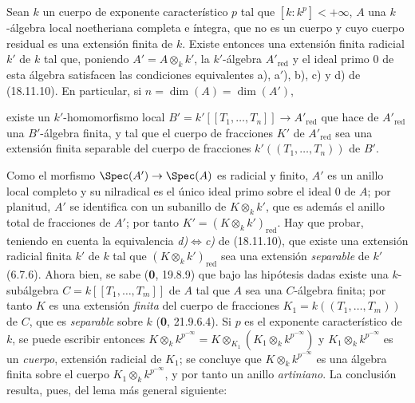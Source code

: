 \begin{corollary}[18.11.12]
\label{IV.18.11.12}
Sean $k$ un cuerpo de exponente característico $p$ tal que $[k:k^p]<+\infty$, $A$ una $k$-álgebra local noetheriana completa e íntegra, que no es un cuerpo y cuyo cuerpo residual es una extensión finita de $k$. Existe entonces una extensión finita radicial $k'$ de $k$ tal que, poniendo $A'=A\otimes_k k'$, la $k'$-álgebra $A'_{\mathrm{red}}$ y el ideal primo $0$ de esta álgebra satisfacen las condiciones equivalentes \textup{a), a$'$), b), c)} y \textup{d)} de \textup{(18.11.10)}. En particular, si $n=\dim(A)=\dim(A')$,


existe un $k'$-homomorfismo local $B'=k'[[T_1,\ldots,T_n]]\to A'_{\mathrm{red}}$ que hace de $A'_{\mathrm{red}}$ una $B'$-álgebra finita, y tal que el cuerpo de fracciones $K'$ de $A'_{\mathrm{red}}$ sea una extensión finita \textup{separable} del cuerpo de fracciones $k'((T_1,\ldots,T_n))$ de $B'$.
\end{corollary}

Como el morfismo $\Spec(A')\to\Spec(A)$ es radicial y finito, $A'$ es un anillo local completo y su nilradical es el único ideal primo sobre el ideal $0$ de $A$; por planitud, $A'$ se identifica con un subanillo de $K\otimes_k k'$, que es además el anillo total de fracciones de $A'$; por tanto $K'=(K\otimes_k k')_{\mathrm{red}}$. Hay que probar, teniendo en cuenta la equivalencia \emph{d)}$\Leftrightarrow$\emph{c)} de (18.11.10), que existe una extensión radicial finita $k'$ de $k$ tal que $(K\otimes_k k')_{\mathrm{red}}$ sea una extensión \emph{separable} de $k'$ (6.7.6). Ahora bien, se sabe (\textbf 0, 19.8.9) que bajo las hipótesis dadas existe una $k$-subálgebra $C=k[[T_1,\ldots,T_m]]$ de $A$ tal que $A$ sea una $C$-álgebra finita; por tanto $K$ es una extensión \emph{finita} del cuerpo de fracciones $K_1=k((T_1,\ldots,T_m))$ de $C$, que es \emph{separable} sobre $k$ (\textbf 0, 21.9.6.4). Si $p$ es el exponente característico de $k$, se puede escribir entonces
$K\otimes_k k^{p^{-\infty}}=K\otimes_{K_1}(K_1\otimes_k k^{p^{-\infty}})$
y $K_1\otimes_k k^{p^{-\infty}}$ es un \emph{cuerpo}, extensión radicial de $K_1$; se concluye que $K\otimes_k k^{p^{-\infty}}$ es una álgebra finita sobre el cuerpo $K_1\otimes_k k^{p^{-\infty}}$, y por tanto un anillo \emph{artiniano}. La conclusión resulta, pues, del lema más general siguiente:

